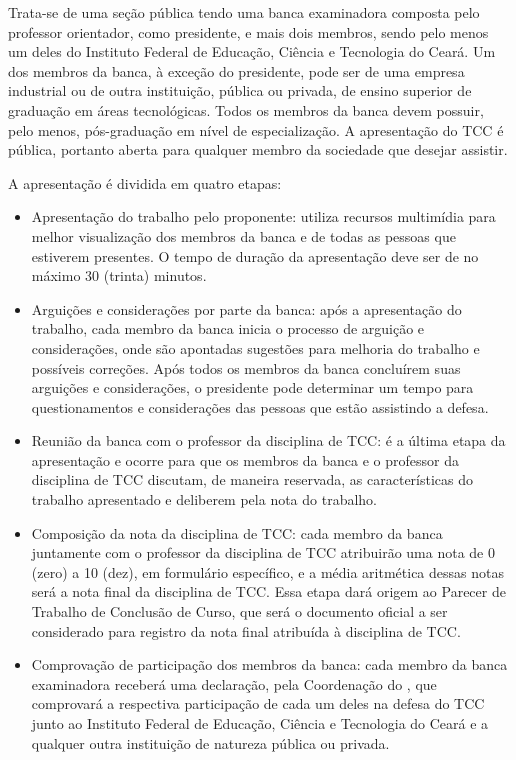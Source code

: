 \documentclass{paper}
\begin{document}
Trata-se de uma seção pública tendo uma banca examinadora composta pelo professor orientador, como presidente, e mais dois membros, sendo pelo menos um deles do Instituto Federal de Educação, Ciência e Tecnologia do Ceará. Um dos membros da banca, à exceção do presidente, pode ser de uma empresa industrial ou de outra instituição, pública ou privada, de ensino superior de graduação em áreas tecnológicas.  Todos os membros da banca devem possuir, pelo menos, pós-graduação em nível de especialização.  A apresentação do TCC é pública, portanto aberta para qualquer membro da sociedade que desejar assistir.

A apresentação é dividida em quatro etapas:

\begin{itemize}
\item Apresentação do trabalho pelo proponente: utiliza recursos multimídia para melhor visualização dos membros da banca e de todas as pessoas que estiverem presentes. O tempo de duração da apresentação deve ser de no máximo 30 (trinta) minutos.
\item Arguições e considerações por parte da banca: após a apresentação do trabalho, cada membro da banca inicia o processo de arguição e considerações, onde são apontadas sugestões para melhoria do trabalho e possíveis correções. Após todos os membros da banca concluírem suas arguições e considerações, o presidente pode determinar um tempo para questionamentos e considerações das pessoas que estão assistindo a defesa.
\item Reunião da banca com o professor da disciplina de TCC: é a última etapa da apresentação e ocorre para que os membros da banca e o professor da disciplina de TCC discutam, de maneira reservada, as características do trabalho apresentado e deliberem pela nota do trabalho.
\item Composição da nota da disciplina de TCC: cada membro da banca juntamente com o professor da disciplina de TCC atribuirão uma nota de 0 (zero) a 10 (dez), em formulário específico, e a média aritmética dessas notas será a nota final da disciplina de TCC. Essa etapa dará origem ao Parecer de Trabalho de Conclusão de Curso, que será o documento oficial a ser considerado para registro da nota final atribuída à disciplina de TCC.
\item Comprovação de participação dos membros da banca: cada membro da banca examinadora receberá uma declaração, pela Coordenação do \NOMECURSO, que comprovará a respectiva participação de cada um deles na defesa do TCC junto ao Instituto Federal de Educação, Ciência e Tecnologia do Ceará e a qualquer outra instituição de natureza pública ou privada.
\end{itemize}
\end{document}
